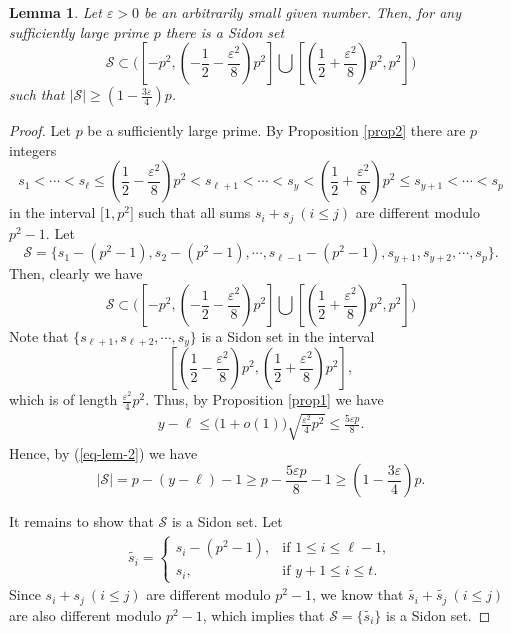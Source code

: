 \documentclass[12pt,a4paper,reqno]{amsart}
\numberwithin{equation}{section}
\theoremstyle{plain}
\newtheorem{lemma}{Lemma}
\theoremstyle{definition}
\begin{document}
\begin{lemma}\label{lem1}
Let $\varepsilon>0$ be an arbitrarily small given number. Then, for any sufficiently large prime $p$ there is a Sidon set 
$$
\mathscr{S}\subset \bigg(\left[-p^2, \left(-\frac{1}{2}-\frac{\varepsilon^2}{8}\right)p^2\right]\bigcup \left[\left(\frac{1}{2}+\frac{\varepsilon^2}{8}\right)p^2, p^2\right]\bigg)
$$ 
such that $\big|\mathscr{S}\big|\ge \left(1-\frac{3\varepsilon}{4}\right)p$.
\end{lemma}
\begin{proof}
Let $p$ be a sufficiently large prime. By Proposition \ref{prop2} there are $p$ integers
$$
s_1<\cdots<s_\ell\le \left(\frac{1}{2}-\frac{\varepsilon^2}{8}\right)p^2<s_{\ell+1}<\cdots<s_y<\left(\frac{1}{2}+\frac{\varepsilon^2}{8}\right)p^2\le s_{y+1}<\cdots<s_p
$$
in the interval $\big[1, p^2\big]$ such that 
all sums 
$
s_i+s_j\ (i\le j)
$
are different modulo $p^2-1$. Let
$$
\mathscr{S}=\Big\{s_1-(p^2-1),s_2-(p^2-1),\cdots, s_{\ell-1}-(p^2-1),s_{y+1}, s_{y+2},\cdots, s_p\Big\}.
$$
Then, clearly we have
$$
\mathscr{S}\subset \bigg(\left[-p^2, \left(-\frac{1}{2}-\frac{\varepsilon^2}{8}\right)p^2\right]\bigcup \left[\left(\frac{1}{2}+\frac{\varepsilon^2}{8}\right)p^2, p^2\right]\bigg)
$$ 
Note that $\big\{s_{\ell+1}, s_{\ell+2}, \cdots, s_y\big\}$ is a Sidon set in the interval 
$$
\left[\left(\frac{1}{2}-\frac{\varepsilon^2}{8}\right)p^2, \left(\frac{1}{2}+\frac{\varepsilon^2}{8}\right)p^2\right],
$$ 
which is of length $\frac{\varepsilon^2}{4}p^2$. Thus, by Proposition \ref{prop1} we have
\begin{align}\label{eq-lem-2}
y-\ell\le \big(1+o(1)\big)\sqrt{\frac{\varepsilon^2}{4}p^2}\le \frac{5\varepsilon p}{8}.
\end{align}
Hence, by (\ref{eq-lem-2}) we have
$$
\big|\mathscr{S}\big|=p-(y-\ell)-1\ge p-\frac{5\varepsilon p}{8}-1\ge \left(1-\frac{3\varepsilon}{4}\right)p.
$$

It remains to show that $\mathscr{S}$ is a Sidon set. Let
\begin{align*}
\widetilde{s_i}=
\begin{cases}
s_i-(p^2-1), & \text{if~}1\le i\le \ell-1,\\
s_i, & \text{if~}y+1\le i\le t.
\end{cases}
\end{align*}
Since 
$
s_i+s_j\ (i\le j)
$
are different modulo $p^2-1$, we know that 
$
\widetilde{s_i}+\widetilde{s_j}\ (i\le j)
$
are also different modulo $p^2-1$, which implies that $\mathscr{S}=\big\{\widetilde{s_i}\big\}$ is a Sidon set.
\end{proof}
\end{document}
